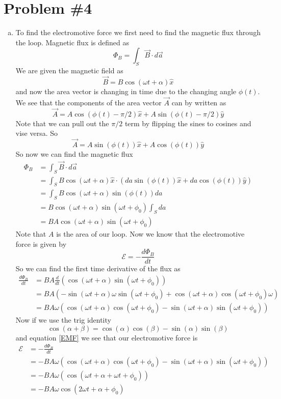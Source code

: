 \documentclass[11pt]{article}
\numberwithin{equation}{section}
\newcommand{\emf}{\mathcal{E}}
\begin{document}
\section{Problem \#4}
\begin{enumerate}[(a)]
\item
To find the electromotive force we first need to find the magnetic flux through the loop. Magnetic flux is defined as
$$\Phi_B = \int_S\vec{B}\cdot d\vec{a}$$
We are given the magnetic field as
$$\vec{B} = B\cos(\omega t+\alpha)\hat{x}$$
and now the area vector is changing in time due to the changing angle $\phi(t)$. We see that the components of the area vector $\vec{A}$ can by written as
$$\vec{A} = A\cos(\phi(t)-\pi/2)\hat{x} + A\sin(\phi(t) - \pi/2)\hat{y}$$
Note that we can pull out the $\pi/2$ term by flipping the sines to cosines and vise versa. So
$$\vec{A} = A\sin(\phi(t))\hat{x} + A\cos(\phi(t))\hat{y}$$
So now we can find the magnetic flux
\begin{align*}
\Phi_B &= \int_S\vec{B}\cdot d\vec{a}\\
&= \int_SB\cos(\omega t+\alpha)\hat{x}\cdot\left(da\sin(\phi(t))\hat{x} + da\cos(\phi(t))\hat{y}\right)\\
&= \int_SB\cos(\omega t+\alpha)\sin(\phi(t))da\\
&= B\cos(\omega t+\alpha)\sin(\omega t + \phi_0)\int_Sda\\
&= BA\cos(\omega t+\alpha)\sin(\omega t + \phi_0)
\end{align*}
Note that $A$ is the area of our loop. Now we know that the electromotive force is given by
\begin{equation}
\emf = -\frac{d\Phi_B}{dt}
\label{EMF}
\end{equation}
So we can find the first time derivative of the flux as
\begin{align*}
\frac{d\Phi_B}{dt} &= BA\frac{d}{dt}\left(\cos(\omega t+\alpha)\sin(\omega t + \phi_0)\right)\\
&= BA\left(-\sin(\omega t+\alpha)\omega\sin(\omega t + \phi_0)+\cos(\omega t+\alpha)\cos(\omega t + \phi_0)\omega\right)\\
&= BA\omega\left(\cos(\omega t+\alpha)\cos(\omega t + \phi_0)-\sin(\omega t+\alpha)\sin(\omega t + \phi_0)\right)
\end{align*}
Now if we use the trig identity 
$$\cos(\alpha+\beta) = \cos(\alpha)\cos(\beta)-\sin(\alpha)\sin(\beta)$$
and equation \ref{EMF} we see that our electromotive force is 
\begin{align*}
\emf &= -\frac{d\Phi_B}{dt}\\
&= -BA\omega\left(\cos(\omega t+\alpha)\cos(\omega t + \phi_0)-\sin(\omega t+\alpha)\sin(\omega t + \phi_0)\right)\\
&= -BA\omega\left(\cos(\omega t+\alpha+\omega t + \phi_0)\right)\\
&= -BA\omega\cos(2\omega t+\alpha+\phi_0)
\end{align*}


\end{enumerate}
\end{document}
